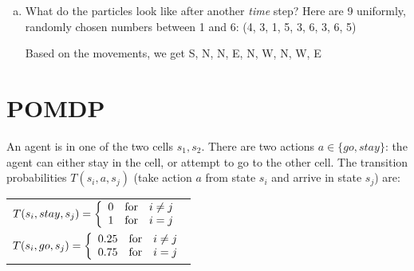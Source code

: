 \documentclass[12pt]{article}
\begin{document}
\begin{enumerate}[a)]
\item{What do the particles look like after another \emph{time} step?
    Here are 9 uniformly, randomly chosen numbers between 1 and 6: (4,
    3, 1, 5, 3, 6, 3, 6, 5)}

Based on the movements, we get S, N, N, E, N, W, N, W, E

\begin{center}
\end{center}

\end{enumerate}

\clearpage

\section{POMDP}

An agent is in one of the two cells $s_1,s_2$.  There are two actions
$a \in \{ go, stay\}$: the agent can either stay in the cell, or
attempt to go to the other cell.  The transition probabilities
$T(s_i,a,s_j)$ (take action $a$ from state $s_i$ and arrive in state
$s_j$) are:

\begin{center}
\begin{tabular}{l}
$T(s_i,stay,s_j) = \left\{ \begin{array}{lll}
                                   0 & \hbox{for} & i\neq j \\
                                   1 & \hbox{for} & i = j
                            \end{array}
                    \right.$ \\[.2in]
$T(s_i,go,s_j) = \left\{ \begin{array}{lll}
                                   0.25 & \hbox{for} & i\neq j \\
                                   0.75 & \hbox{for} & i = j
                            \end{array}
                    \right.$
\end{tabular}
\end{center}
\end{document}
